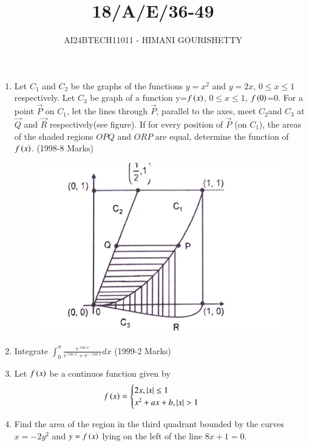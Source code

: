 \documentclass[journal,12pt,onecolumn]{IEEEtran}
\theoremstyle{remark}
\begin{document}

\vspace{3cm}

\title{18/A/E/36-49}
\author{AI24BTECH11011 - HIMANI GOURISHETTY}
\maketitle
\bigskip

\renewcommand{\thefigure}{\theenumi}
\renewcommand{\thetable}{\theenumi}

\begin{enumerate}
\item Let $C_1$ and $C_2$ be the graphs of the functions $y=x^2$ and $y=2x$, $0\le x\le1$ respectively. Let $C_3$ be graph of a function  y=$f\left(x\right)$, $0\le x \le 1$, $f\left(0\right)$=0. For a point $\vec{P}$ on $C_1$, let the lines through $\vec{P}$, parallel to the axes, meet $C_2$and $C_3$ at $\vec{Q}$ and $\vec{R}$ respectively(see figure). If for every position of $\vec{P}$ (on $C_1$), the areas of the shaded regions $OPQ$ and $ORP$ are equal, determine the function of $f\left(x\right)$.
\hfill{(1998-8 Marks)}
\begin{figure}[h!]
\centering
\includegraphics[width=0.7\linewidth]{figs/fig1.png}
\label{fig:11011}
\end{figure}
\item Integrate $\int_{0}^{\pi}\frac{e^{\cos{x}}}{e^{\cos{x}}+e^{-\cos{x}}}dx$
 \hfill{(1999-2 Marks)}\\	      			
\item Let $f\left(x\right)$ be a continuos function given by 
	\begin{align}
	f\left(x\right) &=
	\begin{cases}
	2x, \left\vert x\right\vert\le1\\
	x^2+ax+b, \left\vert x\right\vert>1
	\end{cases}
	\end{align}
\item Find the area of the region in the third quadrant bounded by the curves $x=-2y^2$ and $y=f\left(x\right)$ lying on the left of the line $8x+1=0$. 						

\end{enumerate}
\end{document}
